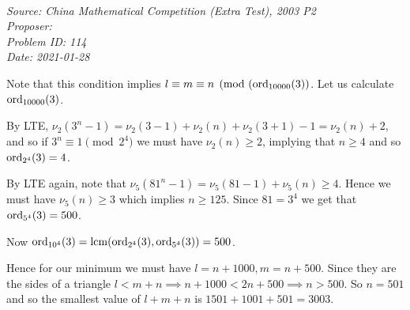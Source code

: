 \SSbreak\\
\emph{Source: China Mathematical Competition (Extra Test), 2003 P2}\\
\emph{Proposer: \Pss}\\
\emph{Problem ID: 114}\\
\emph{Date: 2021-01-28}\\
\SSbreak

\bigskip

\begin{solution}\hfil\medskip

Note that this condition implies $l \equiv m \equiv n \pmod{(\operatorname{ord}_{10000}(3)}$. Let us calculate $\operatorname{ord}_{10000}(3)$. \medskip

By LTE, $\nu_2(3^n -1) = \nu_2(3-1) + \nu_2(n) + \nu_2(3+1) - 1 = \nu_2(n) + 2$, and so if $3^n \equiv 1 \pmod 2^4$ we must have $\nu_2(n) \ge 2$, implying that $n \ge 4$ and so $\operatorname{ord}_{2^4}(3) = 4$. \medskip

By LTE again, note that $\nu_5(81^n - 1) = \nu_5(81 - 1) + \nu_5(n) \ge 4$. Hence we must have $\nu_5(n) \ge 3$ which implies $n \ge 125$. Since $81 = 3^4$ we get that $\operatorname{ord}_{5^4}(3) = 500$. \medskip

Now $\operatorname{ord}_{10^4}(3) = \operatorname{lcm}(\operatorname{ord}_{2^4}(3), \operatorname{ord}_{5^4}(3)) = 500$. \medskip

Hence for our minimum we must have $l = n + 1000, m = n + 500$. Since they are the sides of a triangle $l < m + n \implies n + 1000 < 2n + 500 \implies n > 500$. So $n = 501$ and so the smallest value of $l+m+n$ is $1501 + 1001 + 501 = \boxed{3003}$. 
\end{solution}
